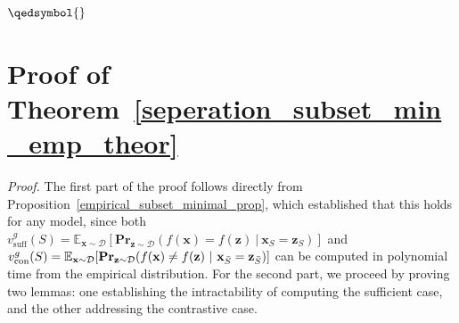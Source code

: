 \documentclass{article}
\newtheorem{proposition}{Proposition}
\newcommand{\z}{\textbf{z}}
\newcommand{\x}{\textbf{x}}
\begin{document}
$\qedsymbol{}$


\section{Proof of Theorem~\ref{seperation_subset_min_emp_theor}}
\label{seperation_subset_min_emp_theor_sec}

\seperationsubsetminemp*


\emph{Proof.} The first part of the proof follows directly from Proposition~\ref{empirical_subset_minimal_prop}, which established that this holds for any model, since both $v^g_{\text{suff}}(S)=\mathbb{E}_{\x\sim\mathcal{D}}[
\textbf{Pr}_{\z\sim\mathcal{D}}(f(\x)=f(\z) \ | \ \x_S=\z_S)]$ and $v^g_{\text{con}}(S)=\mathbb{E}_{\x\sim\mathcal{D}}[
\textbf{Pr}_{\z\sim\mathcal{D}}(f(\x)\neq f(\z) \ | \ \x_{\Bar{S}}=\z_{\Bar{S}})]$ can be computed in polynomial time from the empirical distribution. For the second part, we proceed by proving two lemmas: one establishing the intractability of computing the sufficient case, and the other addressing the contrastive case.








\end{document}
